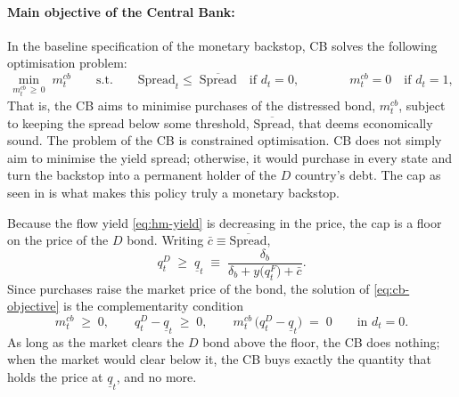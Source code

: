 \paragraph{Main objective of the Central Bank:} In the baseline specification of the monetary backstop,  CB solves the following optimisation problem:
\begin{equation}
\min_{m^{cb}_t\,\ge\,0}\;m^{cb}_t
\qquad\text{s.t.}\qquad
\text{Spread}_t\le\;\overline{\text{Spread}}
\quad\text{if } d_t=0,
\qquad\qquad
m^{cb}_t=0\quad\text{if } d_t=1,
\label{eq:cb-objective}
\end{equation}
That is, the CB aims to minimise  purchases of the distressed bond, $m^{cb}_t$, subject to keeping the spread below some threshold, $\overline{\text{Spread}}$, that  deems economically sound. The problem of the CB is  constrained optimisation.  CB does not simply aim to minimise the yield spread; otherwise, it would purchase in every state and  turn the backstop  into a permanent holder of the $D$ country's debt. The cap\yadd{,} as seen in \yadd{\eqref{eq:cb-objective},} is what makes this policy\rdel{,} truly\rdel{,} a monetary backstop.\\

\begin{yaddblock}
Because the flow yield \eqref{eq:hm-yield} is decreasing in the price, the cap is a
floor on the price of the $D$ bond. Writing $\bar c\equiv\overline{\text{Spread}}$,
\begin{equation}
q^{D}_t\;\ge\;\underline q_t\;\equiv\;\frac{\delta_b}{\delta_b+y\bigl(q^{F}_t\bigr)+\bar c}.
\label{eq:tpi-floor}
\end{equation}
Since purchases raise the market price of the bond, the solution of
\eqref{eq:cb-objective} is the complementarity condition
\begin{equation}
m^{cb}_t\;\ge\;0,
\qquad
q^{D}_t-\underline q_t\;\ge\;0,
\qquad
m^{cb}_t\,\bigl(q^{D}_t-\underline q_t\bigr)\;=\;0
\qquad\text{in } d_t=0 .
\label{eq:tpi-kkt}
\end{equation}
As long as the market clears the $D$ bond above the floor, the CB does nothing; when
the market would clear below it, the CB buys exactly the quantity that holds the
price at $\underline q_t$, and no more.
\end{yaddblock}

